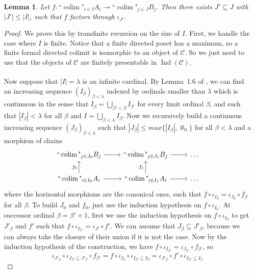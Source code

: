 \documentclass{article}
\newtheorem{Lemma}[theorem]{Lemma}
\newcommand{\fcolim}{\text{``}\colim\text{"}}
\newcommand{\Ind}{\operatorname{Ind}}
\newcommand{\colim}{\operatorname{colim}}
\begin{document}
\begin{Lemma}\label{facto_size}
    Let $f:\fcolim_{i\in I}A_i\xrightarrow{}\fcolim_{j\in J}B_j$. Then there exists $J'\subseteq J$ with $|J'|\leq|I|$, such that $f$ factors through $\iota_{J'}$.
\end{Lemma}
\begin{proof}
    We prove this by transfinite recursion on the size of $I$. First, we handle the case where $I$ is finite. Notice that a finite directed poset has a maximum, so a finite formal directed colimit is isomorphic to an object of $\mathcal{C}$. So we just need to use that the objects of $\mathcal{C}$ are finitely presentable in $\Ind(\mathcal{C})$.\\
    \\
    Now suppose that $|I|=\lambda$ is an infinite cardinal. By Lemma~1.6 of \cite{rosicky1994locally}, we can find an increasing sequence $(I_\beta)_{\beta<\lambda}$ indexed by ordinals smaller than $\lambda$ which is continuous in the sense that $I_\beta=\bigcup_{\beta'<\beta}I_{\beta'}$ for every limit ordinal $\beta$, and such that $|I_\beta|<\lambda$ for all $\beta$ and $I=\bigcup_{\beta<\lambda}I_\beta$. Now we recursively build a continuous increasing sequence $(J_\beta)_{\beta<\lambda}$ such that $|J_\beta|\leq max\{|I_\beta|,\aleph_0\}$ for all $\beta<\lambda$ and a morphism of chains 
\[\begin{tikzcd}
	{\fcolim_{j\in J_0}B_j} & {\fcolim_{j\in J_1}B_j} & \dots \\
	{\fcolim_{i\in I_0}A_i} & {\fcolim_{i\in I_1}A_i} & \dots
	\arrow[from=1-1, to=1-2]
	\arrow[from=1-2, to=1-3]
	\arrow["{f_0}", from=2-1, to=1-1]
	\arrow[from=2-1, to=2-2]
	\arrow["{f_1}", from=2-2, to=1-2]
	\arrow[from=2-2, to=2-3]
\end{tikzcd}\]
    where the horizontal morphisms are the canonical ones, such that $f\circ\iota_{I_\beta}=\iota_{J_\beta}\circ f_\beta$ for all $\beta$. To build $J_0$ and $f_0$, just use the induction hypothesis on $f\circ\iota_{I_0}$. At successor ordinal $\beta=\beta'+1$, first we use the induction hypothesis on $f\circ\iota_{I_{\beta}}$ to get $J'_{\beta}$ and $f'$ such that $f\circ\iota_{I_{\beta'}}=\iota_{J'}\circ f'$. We can assume that $J_\beta\subseteq J'_{\beta}$, because we can always take the closure of their union if it is not the case. Now by the induction hypothesis of the construction, we have $f\circ\iota_{I_{\beta'}}=\iota_{J_{\beta'}}\circ f_{\beta'}$, so $$\iota_{J'_{\beta}}\circ\iota_{J_{\beta'}\subseteq J'_{\beta}}\circ f_{\beta'}=f\circ\iota_{I_\beta}\circ\iota_{I_{\beta'}\subseteq I_\beta}=\iota_{J'_{\beta}}\circ f'\circ\iota_{I_{\beta'}\subseteq I_\beta}$$

\end{proof}
\end{document}
